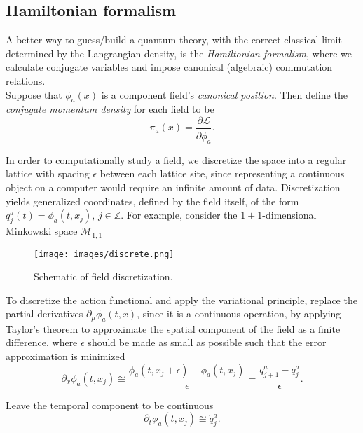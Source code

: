 \subsection*{Hamiltonian formalism}

\noindent A better way to guess/build a quantum theory, with the correct classical limit determined by the Langrangian density, is the \textit{Hamiltonian formalism}, where we calculate conjugate variables and impose canonical (algebraic) commutation relations. \\

\noindent Suppose that $\phi_a(x)$ is a component field's \textit{canonical position}. Then define the \textit{conjugate momentum density} for each field to be 
\begin{equation}
\pi_a(x) = \frac{\partial \mathscr{L}}{\partial \dot{\phi_a}}.
\end{equation}

\noindent In order to computationally study a field, we discretize the space into a regular lattice with spacing $\epsilon$ between each lattice site, since representing a continuous object on a computer would require an infinite amount of data. Discretization yields generalized coordinates, defined by the field itself, of the form $q_j^a(t) = \phi_a(t, x_j), \, j \in \mathbb{Z}$. For example, consider the $1+1$-dimensional Minkowski space $\mathcal{M}_{1,1}$

\begin{figure}[H]
	\centering
	\texttt{[image: images/discrete.png]}
	\caption{Schematic of field discretization.}
	\label{fig:fig3}
\end{figure}

\noindent To discretize the action functional and apply the variational principle, replace the partial derivatives $\partial_\mu \phi_a(t, x)$, since it is a continuous operation, by applying Taylor's theorem to approximate the spatial component of the field as a finite difference, where $\epsilon$ should be made as small as possible such that the error approximation is minimized
\begin{equation}
\partial_x \phi_a(t, x_j) \cong \frac{\phi_a(t, x_j + \epsilon) - \phi_a(t, x_j)}{\epsilon} = \frac{q^a_{j+1} - q^a_j}{\epsilon}.
\end{equation}

\noindent Leave the temporal component to be continuous
\begin{equation}
\partial_t \phi_a(t, x_j) \cong \dot{q}_j^a . 
\end{equation}


